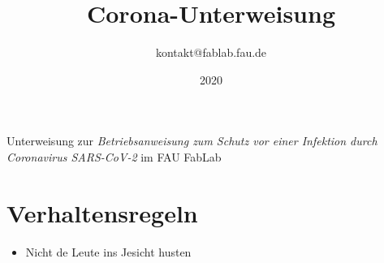 \documentclass[13pt]{\basedir/fablab-document}
\date{2020}
\author{kontakt@fablab.fau.de}
\title{Corona-Unterweisung}
\begin{document}
\maketitle
Unterweisung zur \emph{Betriebsanweisung zum Schutz vor einer Infektion durch Coronavirus SARS-CoV-2} im FAU FabLab

\vbox{\vspace{1cm}}


\section{Verhaltensregeln}
\begin{itemize}
  \item  Nicht de Leute ins Jesicht husten
\end{itemize}

\end{document}
